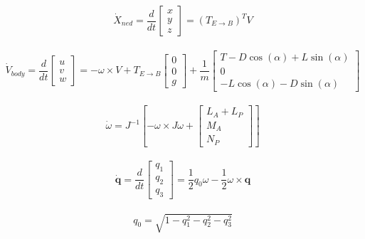 \documentclass[11pt]{article}
\begin{document}
$$\dot{X}_{ned} = \frac{d}{dt} \begin{bmatrix} x \\ y \\ z \end{bmatrix} = (T_{E\xrightarrow{}B})^TV$$\\

$$\dot{V}_{body} = \frac{d}{dt} \begin{bmatrix} u \\ v \\ w  \end{bmatrix} = -\omega \times V + T_{E\xrightarrow{}B}\begin{bmatrix} 0 \\ 0 \\ g \end{bmatrix} + \frac{1}{m} \begin{bmatrix} T - D\cos(\alpha) + L\sin(\alpha) \\ 0 \\ -L\cos(\alpha) - D\sin(\alpha)  \end{bmatrix} $$\\

$$\dot{\omega} = J^{-1}[-\omega \times J\omega + \begin{bmatrix}L_A + L_P \\M_A \\N_P \end{bmatrix}]$$\\

$$\boldsymbol{\dot{q}} = \frac{d}{dt} \begin{bmatrix} q_1 \\ q_2 \\ q_3 \end{bmatrix} = \frac{1}{2}q_{0}\omega - \frac{1}{2}\omega \times \boldsymbol{q}$$\\
$$q_0 = \sqrt{1-q_1^2 - q_2^2 - q_3^2}$$
\end{document}
